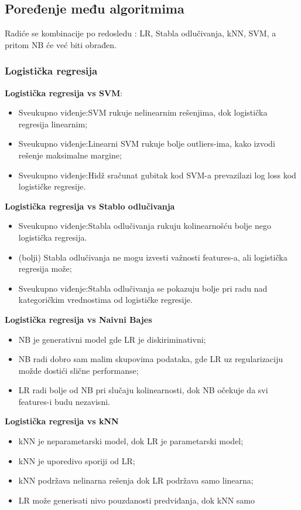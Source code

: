 \documentclass[fontsize=12bp, paper=a4]{scrarticle}
\begin{document}
\subsection{Poređenje među algoritmima}

Radiće se kombinacije po redosledu : LR, Stabla odlučivanja, kNN, SVM, a pritom NB će već biti obrađen.%

\subsubsection{Logistička regresija}
\textbf{Logistička regresija vs SVM}:
\begin{itemize}
    \item Sveukupno viđenje:SVM rukuje nelinearnim rešenjima, dok logistička regresija linearnim;
    \item Sveukupno viđenje:Linearni SVM rukuje bolje outliers-ima, kako izvodi rešenje maksimalne margine;
    \item Sveukupno viđenje:Hidž sračunat gubitak kod SVM-a prevazilazi log loss kod logističke regresije.
\end{itemize}

\textbf{Logistička regresija vs Stablo odlučivanja}
\begin{itemize}
    \item Sveukupno viđenje:Stabla odlučivanja rukuju kolinearnošću bolje nego logistička regresija.
    \item (bolji) Stabla odlučivanja ne mogu izvesti važnosti features-a, ali logistička regresija može;
    \item Sveukupno viđenje:Stabla odlučivanja se pokazuju bolje pri radu nad kategoričkim vrednostima od logističke regresije.
\end{itemize}

\textbf{Logistička regresija vs Naivni Bajes}
\begin{itemize}
    \item NB je generativni model gde LR je diskiriminativni;
    \item NB radi dobro sam malim skupovima podataka, gde LR uz regularizaciju možde dostići slične performanse;
    \item LR radi bolje od NB pri slučaju kolinearnosti, dok NB očekuje da svi features-i budu nezavisni.
\end{itemize}

\textbf{Logistička regresija vs kNN}
\begin{itemize}
    \item kNN je neparametarski model, dok LR je parametarski model;
    \item kNN je uporedivo sporiji od LR;
    \item kNN podržava nelinarna rešenja dok LR podržava samo linearna;
    \item LR može generisati nivo pouzdanosti predviđanja, dok kNN samo 
\end{itemize}
\end{document}

